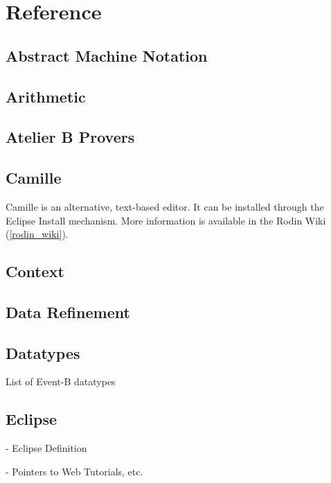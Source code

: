 \chapter{Reference}
\label{reference}

\section{Abstract Machine Notation}
\label{abstract_machine_notation}

\section{Arithmetic}
\label{arithmetic}

\section{Atelier B Provers}
\label{atelier_b_provers}

\section{Camille}
\label{camille}

Camille is an alternative, text-based editor.  It can be installed through the Eclipse Install mechanism.  More information is available in the Rodin Wiki (\ref{rodin_wiki}).

\section{Context}
\label{context}

\section{Data Refinement}
\label{data_refinement}

\section{Datatypes}
\label{datatypes}

List of Event-B datatypes

\section{Eclipse}
\label{eclipse}

- Eclipse Definition

- Pointers to Web Tutorials, etc.

